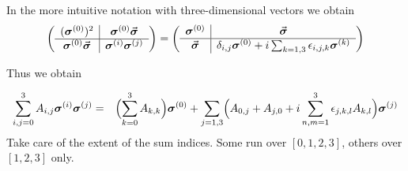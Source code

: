 \documentclass[11pt,a4paper]{report}
\begin{document}
In the more intuitive notation with three-dimensional vectors we obtain
\begin{eqnarray}
\left(\begin{array}{c|c}
(\bm{\sigma}^{(0)} )^2
& \bm{\sigma}^{(0)}\vec{\bm{\sigma}} \\
\hline
\bm{\sigma}^{(0)}\vec{\bm{\sigma}} & \bm{\sigma}^{(i)}\bm{\sigma}^{(j)}
\end{array}\right)
=
\left(\begin{array}{c|c}
\bm{\sigma}^{(0)} & \vec{\bm{\sigma}} \\
\hline
\vec{\bm{\sigma}} & \delta_{i,j}\bm{\sigma}^{(0)}
+i\sum_{k=1,3}\epsilon_{i,j,k}\bm{\sigma}^{(k)}
\end{array}\right)
\end{eqnarray}

Thus we obtain
\begin{myshadowminipage}{}
\begin{eqnarray}
\sum_{i,j=0}^3 A_{i,j}\bm{\sigma}^{(i)}\bm{\sigma}^{(j)}
&=&\Bigl(\sum_{k=0}^3 A_{k,k}\Bigr)\bm{\sigma}^{(0)}
+\sum_{j=1,3}\Bigl(A_{0,j}+A_{j,0}+i\sum_{n,m=1}^3\epsilon_{j,k,l}A_{k,l}\Bigr)
\bm{\sigma}^{(j)}
\label{eq:spinorproductformula}
\end{eqnarray}
Take care of the extent of the sum indices. Some run over $[0,1,2,3]$,
others over $[1,2,3]$ only.
\end{myshadowminipage}{}

\clearpage


\end{document}
